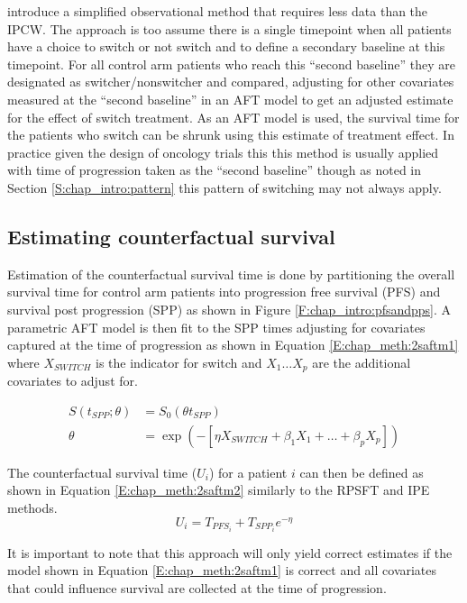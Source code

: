 \cite{Latimer2013} introduce a simplified observational method that requires less data than the IPCW. The approach is too assume there is a single timepoint when all patients have a choice to switch or not switch and to define a secondary baseline at this timepoint. For all control arm patients who reach this ``second baseline'' they are designated as switcher/nonswitcher and compared, adjusting for other covariates measured at the ``second baseline'' in an AFT model to get an adjusted estimate for the effect of switch treatment. As an AFT model is used, the survival time for the patients who switch can be shrunk using this estimate of treatment effect. In practice given the design of oncology trials this this method is usually applied with time of progression  taken as the ``second baseline'' though as noted in Section \ref{S:chap_intro:pattern} this pattern of switching may not always apply. 

\subsection{Estimating counterfactual survival}

Estimation of the counterfactual survival time is done by partitioning the overall survival time for control arm patients into progression free survival (PFS) and survival post progression (SPP) as shown in Figure \ref{F:chap_intro:pfsandpps}. A parametric AFT model is then fit to the SPP times adjusting for covariates captured at the time of progression as shown in Equation \ref{E:chap_meth:2saftm1} where $X_{SWITCH}$ is the indicator for switch and $X_1 \ldots X_p$ are the additional covariates to adjust for.

\begin{align}
S(t_{SPP}; \theta) &= S_0(\theta t_{SPP}) \label{E:chap_meth:2saftm1} \\
\theta &= \exp(-[\eta X_{SWITCH} + \beta_1 X_1 + \ldots + \beta_p X_p]) \nonumber
\end{align}

The counterfactual survival time ($U_i$) for a patient $i$ can then be defined as shown in Equation \ref{E:chap_meth:2saftm2} similarly to the RPSFT and IPE methods.
\begin{equation}
U_i = T_{PFS_i} + T_{SPP_i} e^{-\eta}  \label{E:chap_meth:2saftm2}
\end{equation}

It is important to note that this approach will only yield correct estimates if the model shown in Equation \ref{E:chap_meth:2saftm1} is correct and all covariates that could influence survival are collected at the time of progression.

